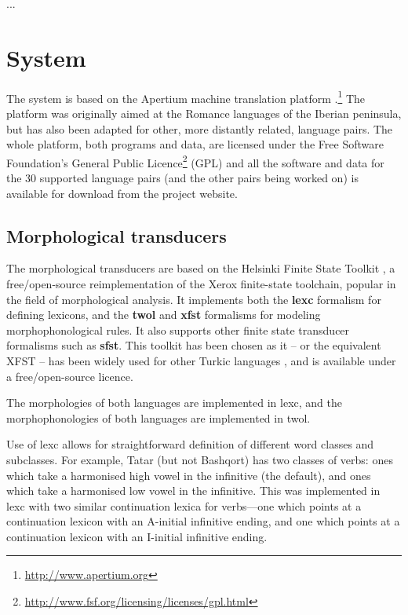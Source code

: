 \documentclass[11pt,a4paper]{article}
\begin{document}
...


\section{System}
\label{sec:sys}

The system is based on the Apertium machine translation platform \cite{apertium/2011}.\footnote{\url{http://www.apertium.org}} The 
platform was originally aimed at the Romance languages of the Iberian peninsula, but has also been adapted for 
other, more distantly related, language pairs.
The whole platform, both programs and data, are licensed under the Free Software Foundation's General Public 
Licence\footnote{\url{http://www.fsf.org/licensing/licenses/gpl.html}} (GPL) and all the software and data for the 
30 supported language pairs (and the other pairs being worked on) is available for download from the project 
website.

\subsection{Morphological transducers}

The morphological transducers are based on the Helsinki Finite State Toolkit \cite{hfst/2011}, a free/open-source reimplementation of the Xerox finite-state toolchain, popular in the field of morphological analysis. It implements both the \textbf{lexc} formalism for defining lexicons, and the \textbf{twol} and \textbf{xfst} formalisms for modeling morphophonological rules. It also supports other finite state transducer formalisms such as \textbf{sfst}. This toolkit has been chosen as it -- or the equivalent XFST -- has been widely used for other Turkic languages \cite{coltekin2010,altintas2001,tantug2006}, and is available under a free/open-source licence.

The morphologies of both languages are implemented in lexc, and the morphophonologies of both languages are implemented in twol.

Use of lexc allows for straightforward definition of different word classes and subclasses.  For example, Tatar (but not Bashqort) has two classes of verbs: ones which take a harmonised high vowel in the infinitive (the default), and ones which take a harmonised low vowel in the infinitive.  This was implemented in lexc with two similar continuation lexica for verbs---one which points at a continuation lexicon with an A-initial infinitive ending, and one which points at a continuation lexicon with an I-initial infinitive ending.
\end{document}
